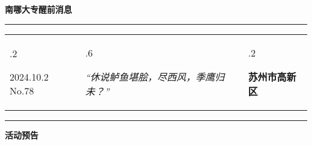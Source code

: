 \documentclass[letterpaper, 12pt]{article}
\begin{document}
\begin{center}
    \Huge\textbf{南哪大专醒前消息}
\end{center}
\vspace{4mm}
\hrule
\renewcommand\tabularxcolumn[1]{m{#1}}
\begin{tabularx}{\textwidth}{>{\hsize.2\hsize}X>{\hsize.6\hsize}X>{\hsize.2\hsize}X}
    \begin{flushleft}
        2024.10.2\, No.78
    \end{flushleft}
    &
    \begin{center}
        \textit{“休说鲈鱼堪脍，尽西风，季鹰归未？”}
    \end{center}
    &
    \begin{flushright}
        \textbf{苏州市高新区}
    \end{flushright}
\end{tabularx}
\vspace{-3.5mm}
\hrule
\vspace{4mm}
\centerline{\huge\textbf{活动预告}}
\end{document}
